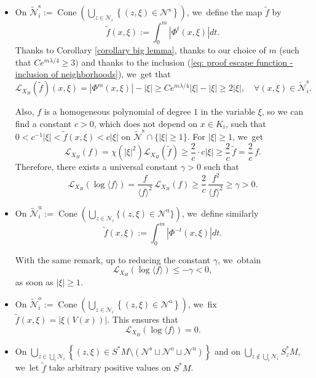 \documentclass[11pt]{article}
\let\oldbigcup\bigcup
\newcommand{\ro}{\mathrm{o}}
\newcommand{\rs}{\mathrm{s}}
\newcommand{\ru}{\mathrm{u}}
\theoremstyle{definition}
\theoremstyle{plain}
\newcommand{\Lie}{\mathcal{L}}
\newcommand{\Ncal}{\mathcal{N}}
\newcommand{\w}[1]{\langle {#1} \rangle}
\DeclareMathOperator{\Cone}{Cone}
\begin{document}
\begin{itemize}
\item On $\widetilde{\Ncal}_i^\rs:= \Cone \left(\bigcup_{z \in \Ncal_i} \left\{(z,\xi) \in \Ncal^\rs \right\}\right)$, we~define the map $\tilde{f}$ by
\[
\widetilde{f} (x,\xi):= \int_0^m |\Phi^t (x,\xi)| dt.
\]
Thanks to Corollary \ref{corollary big lemma}, thanks to our choice of $m$ (such that $C e^{m \lambda /4} \geq 3)$ and thanks to the inclusion (\ref{eq: proof escape function - inclusion of neighborhoods}), we~get that
\[
\Lie_{X_H} (\tilde{f})(x,\xi) = |\Phi^m (x,\xi)| - |\xi| \geq Ce^{m\lambda/4} |\xi| - |\xi| \geq 2 |\xi|, \quad \forall (x,\xi) \in \widetilde{\Ncal}_i^\rs.
\]

Also, $f$ is a homogeneous polynomial of degree $1$ in the variable $\xi$, so we can find a constant $c > 0$, which does not depend on $x \in K_i$, such that $0 < c^{-1} |\xi| < \widetilde{f} (x,\xi) < c |\xi|$ on $\widetilde{\Ncal}^\rs \cap \{|\xi| \geq 1\}$. For $|\xi| \geq 1$, we~get
\[
\Lie_{X_H} (f) = \chi (|\xi|^2) \Lie_{X_H} (\tilde{f}) \geq \frac{2}{c}\cdot c|\xi| \geq \frac{2}{c}\, \tilde{f} = \frac{2}{c}\, f.
\]
Therefore, there exists a universal constant $\gamma > 0$ such that
\begin{equation}\label{eq: proof escape function - estimate 1 on f}
\Lie_{X_H} (\log \w{f}) = \frac{f}{\w{f}^2}\, \Lie_{X_H} (f) \geq \frac{2}{c}\, \frac{f^2}{\w{f}^2} \geq \gamma > 0.
\end{equation}
\item On $\widetilde{\Ncal}_i^\ru:= \Cone \left(\bigcup_{z \in \Ncal_i} \{(z,\xi) \in \Ncal^\ru \} \right)$, we~define similarly
\[
\tilde{f}(x,\xi):= \int_0^m |\Phi^{-t} (x,\xi)| dt.
\]

With the same remark, up to reducing the constant $\gamma$, we~obtain
\begin{equation}\label{eq: proof escape function - estimate 2 on f}
\Lie_{X_H} (\log \w{f}) \leq -\gamma < 0,
\end{equation}
as soon as $|\xi| \geq 1$.
\item On $\widetilde{\Ncal}_i^\ro:= \Cone \left(\bigcup_{z \in \Ncal_i} \left\{ (z,\xi) \in \Ncal^\ro \right\} \right)$, we~fix $\tilde{f} (x,\xi) = |\xi (V (x))|$. This ensures that
\[
\Lie_{X_H} (\log \w{f}) = 0.
\]
\item On $ \bigcup_{z \in \oldbigcup_i \Ncal_i} \left\{ (z,\xi) \in S^* M \setminus \left(\Ncal^\rs \sqcup \Ncal^\ro \sqcup \Ncal^\ru \right) \right\}$ and on $\bigcup_{z \notin \oldbigcup_{i} \Ncal_i} S_z^* M$, we~let $\tilde{f}$ take arbitrary positive values on $S^*M$.
\end{itemize}
\end{document}
